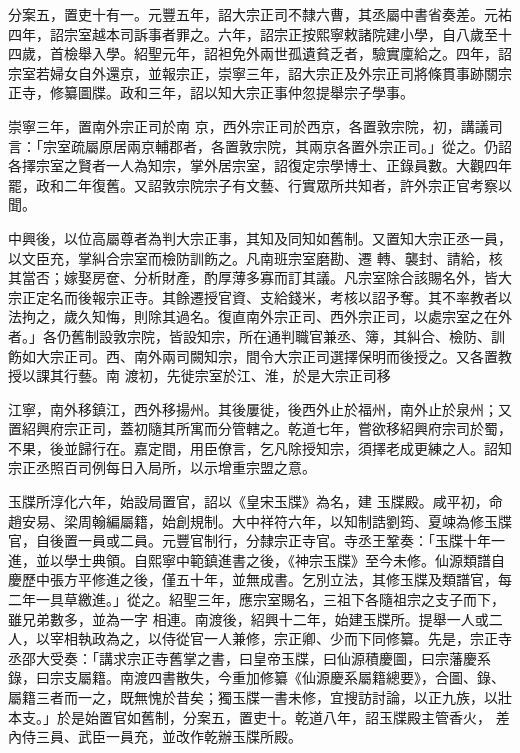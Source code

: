\begin{pinyinscope}
 分案五，置吏十有一。元豐五年，詔大宗正司不隸六曹，其丞屬中書省奏差。元祐四年，詔宗室越本司訴事者罪之。六年，詔宗正按熙寧敕諸院建小學，自八歲至十四歲，首檢舉入學。紹聖元年，詔袒免外兩世孤遺貧乏者，驗實廩給之。四年，詔宗室若婦女自外還京，並報宗正，崇寧三年，詔大宗正及外宗正司將條貫事跡關宗正寺，修纂圖牒。政和三年，詔以知大宗正事仲忽提舉宗子學事。



 崇寧三年，置南外宗正司於南
 京，西外宗正司於西京，各置敦宗院，初，講議司言：「宗室疏屬原居兩京輔郡者，各置敦宗院，其兩京各置外宗正司。」從之。仍詔各擇宗室之賢者一人為知宗，掌外居宗室，詔復定宗學博士、正錄員數。大觀四年罷，政和二年復舊。又詔敦宗院宗子有文藝、行實眾所共知者，許外宗正官考察以聞。



 中興後，以位高屬尊者為判大宗正事，其知及同知如舊制。又置知大宗正丞一員，以文臣充，掌糾合宗室而檢防訓飭之。凡南班宗室磨勘、遷
 轉、襲封、請給，核其當否；嫁娶房奩、分析財產，酌厚薄多寡而訂其議。凡宗室除合該賜名外，皆大宗正定名而後報宗正寺。其餘遷授官資、支給錢米，考核以詔予奪。其不率教者以法拘之，歲久知悔，則除其過名。復直南外宗正司、西外宗正司，以處宗室之在外者。」各仍舊制設敦宗院，皆設知宗，所在通判職官兼丞、簿，其糾合、檢防、訓飭如大宗正司。西、南外兩司闕知宗，間令大宗正司選擇保明而後授之。又各置教授以課其行藝。南
 渡初，先徙宗室於江、淮，於是大宗正司移



 江寧，南外移鎮江，西外移揚州。其後屢徙，後西外止於福州，南外止於泉州；又置紹興府宗正司，蓋初隨其所寓而分管轄之。乾道七年，嘗欲移紹興府宗司於蜀，不果，後並歸行在。嘉定間，用臣僚言，乞凡除授知宗，須擇老成更練之人。詔知宗正丞照百司例每日入局所，以示增重宗盟之意。



 玉牒所淳化六年，始設局置官，詔以《皇宋玉牒》為名，建
 玉牒殿。咸平初，命趙安易、梁周翰編屬籍，始創規制。大中祥符六年，以知制誥劉筠、夏竦為修玉牒官，自後置一員或二員。元豐官制行，分隸宗正寺官。寺丞王鞏奏：「玉牒十年一進，並以學士典領。自熙寧中範鎮進書之後，《神宗玉牒》至今未修。仙源類譜自慶歷中張方平修進之後，僅五十年，並無成書。乞別立法，其修玉牒及類譜官，每二年一具草繳進。」從之。紹聖三年，應宗室賜名，三祖下各隨祖宗之支子而下，雖兄弟數多，並為一字
 相連。南渡後，紹興十二年，始建玉牒所。提舉一人或二人，以宰相執政為之，以侍從官一人兼修，宗正卿、少而下同修纂。先是，宗正寺丞邵大受奏：「講求宗正寺舊掌之書，曰皇帝玉牒，曰仙源積慶圖，曰宗藩慶系錄，曰宗支屬籍。南渡四書散失，今重加修纂《仙源慶系屬籍總要》，合圖、錄、屬籍三者而一之，既無愧於昔矣；獨玉牒一書未修，宜搜訪討論，以正九族，以壯本支。」於是始置官如舊制，分案五，置吏十。乾道八年，詔玉牒殿主管香火，
 差內侍三員、武臣一員充，並改作乾辦玉牒所殿。




\end{pinyinscope}
